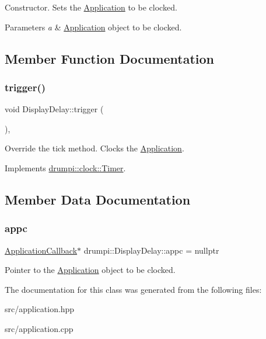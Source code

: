 Constructor. Sets the \hyperlink{classdrumpi_1_1Application}{Application} to be clocked. 
\begin{DoxyParams}{Parameters}
{\em a} & \hyperlink{classdrumpi_1_1Application}{Application} object to be clocked. \\
\hline
\end{DoxyParams}


\subsection{Member Function Documentation}
\mbox{\label{classdrumpi_1_1DisplayDelay_a1fb66a57fea2d6700a190c961e556aa4}} 
\subsubsection{\texorpdfstring{trigger()}{trigger()}}
{\footnotesize\ttfamily void Display\+Delay\+::trigger (\begin{DoxyParamCaption}{ }\end{DoxyParamCaption})\hspace{0.3cm}{\ttfamily [override]}, {\ttfamily [virtual]}}

Override the tick method. Clocks the \hyperlink{classdrumpi_1_1Application}{Application}. 

Implements \hyperlink{classdrumpi_1_1clock_1_1Timer_aeed4c4e653b98280354e0b970f8df68b}{drumpi\+::clock\+::\+Timer}.



\subsection{Member Data Documentation}
\mbox{\label{classdrumpi_1_1DisplayDelay_a1e0ae111b91375c8dd4de7310953728e}} 
\subsubsection{\texorpdfstring{appc}{appc}}
{\footnotesize\ttfamily \hyperlink{classdrumpi_1_1ApplicationCallback}{Application\+Callback}$\ast$ drumpi\+::\+Display\+Delay\+::appc = nullptr\hspace{0.3cm}{\ttfamily [private]}}

Pointer to the {\ttfamily \hyperlink{classdrumpi_1_1Application}{Application}} object to be clocked. 

The documentation for this class was generated from the following files\+:\begin{DoxyCompactItemize}
\item 
src/application.\+hpp\item 
src/application.\+cpp\end{DoxyCompactItemize}
